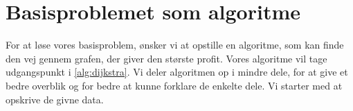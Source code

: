 \section{Basisproblemet som algoritme}
For at løse vores basisproblem, ønsker vi at opstille en algoritme, som kan finde den vej gennem grafen, der giver den største profit. Vores algoritme vil tage udgangspunkt i \autoref{alg:dijkstra}. Vi deler algoritmen op i mindre dele, for at give et bedre overblik og for bedre at kunne forklare de enkelte dele. Vi starter med at opskrive de givne data. 












